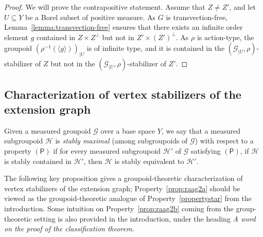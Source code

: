 \documentclass[11pt]{article}
\numberwithin{equation}{section}
\let\mathcal\mathscr
\theoremstyle{plain}
\theoremstyle{definition}
\newcommand{\calg}{\mathcal{G}}
\newcommand{\calh}{\mathcal{H}}
\begin{document}
\begin{proof}
We will prove the contrapositive statement. Assume that $Z\neq Z'$, and let $U\subseteq Y$ be a Borel subset of positive measure. As $G$ is transvection-free, Lemma~\ref{lemma:transvection-free} ensures that there exists an infinite order element $g$ contained in $Z\times Z^\perp$ but not in $Z'\times (Z')^{\perp}$. As $\rho$ is action-type, the groupoid $(\rho^{-1}(\langle g\rangle))_{|U}$ is of infinite type, and it is contained in the $(\calg_{|U},\rho)$-stabilizer of $Z$ but not in the $(\calg_{|U},\rho)$-stabilizer of $Z'$.
\end{proof}

\subsection{Characterization of vertex stabilizers of the extension graph}\label{sec:vertex}

Given a measured groupoid $\calg$ over a base space $Y$, we say that a measured subgroupoid $\calh$ is \emph{stably maximal} (among subgroupoids of $\calg$) with respect to a property $(\mathsf{P})$ if for every measured subgroupoid $\calh'$ of $\calg$ satisfying $(\mathsf{P})$, if $\calh$ is stably contained in $\calh'$, then $\calh$ is stably equivalent to $\calh'$.

The following key proposition gives a groupoid-theoretic characterization of vertex stabilizers of the extension graph; Property~\eqref{prop:raag2a} should be viewed as the groupoid-theoretic analogue of Property~\eqref{propertystar} from the introduction. Some intuition on Property~\eqref{prop:raag2b} coming from the group-theoretic setting is also provided in the introduction, under the heading \emph{A word on the proof of the classification theorem}.
\end{document}
